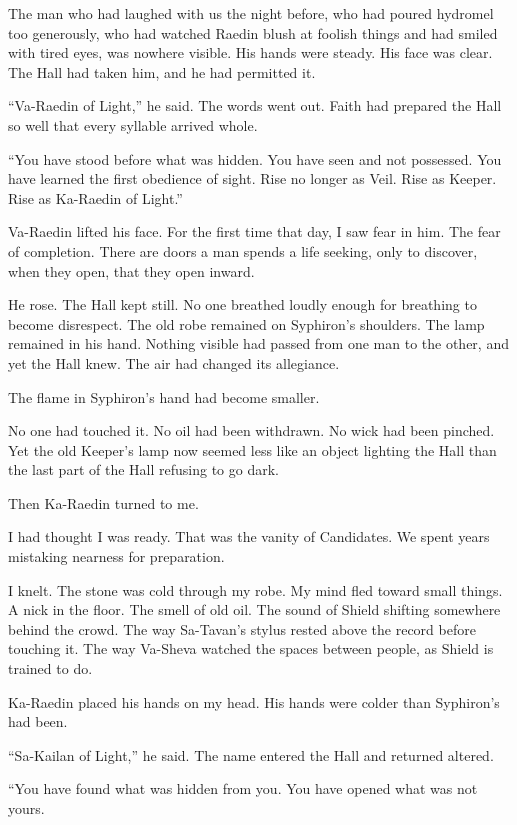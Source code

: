 The man who had laughed with us the night before, who had poured hydromel too generously, who had watched Raedin blush at foolish things and had smiled with tired eyes, was nowhere visible.
His hands were steady.
His face was clear.
The Hall had taken him, and he had permitted it.\par
``Va-Raedin of Light,'' he said.
The words went out.
Faith had prepared the Hall so well that every syllable arrived whole.\par
``You have stood before what was hidden.
You have seen and not possessed.
You have learned the first obedience of sight.
Rise no longer as Veil.
Rise as Keeper.
Rise as Ka-Raedin of Light.''\par
Va-Raedin lifted his face.
For the first time that day, I saw fear in him.
The fear of completion.
There are doors a man spends a life seeking, only to discover, when they open, that they open inward.\par
He rose.
The Hall kept still.
No one breathed loudly enough for breathing to become disrespect.
The old robe remained on Syphiron's shoulders.
The lamp remained in his hand.
Nothing visible had passed from one man to the other, and yet the Hall knew.
The air had changed its allegiance.\par
The flame in Syphiron's hand had become smaller.\par
No one had touched it.
No oil had been withdrawn.
No wick had been pinched.
Yet the old Keeper's lamp now seemed less like an object lighting the Hall than the last part of the Hall refusing to go dark.\par
Then Ka-Raedin turned to me.\par
I had thought I was ready.
That was the vanity of Candidates.
We spent years mistaking nearness for preparation.\par
I knelt.
The stone was cold through my robe.
My mind fled toward small things.
A nick in the floor.
The smell of old oil.
The sound of Shield shifting somewhere behind the crowd.
The way Sa-Tavan's stylus rested above the record before touching it.
The way Va-Sheva watched the spaces between people, as Shield is trained to do.\par
Ka-Raedin placed his hands on my head.
His hands were colder than Syphiron's had been.\par
``Sa-Kailan of Light,'' he said.
The name entered the Hall and returned altered.\par
``You have found what was hidden from you.
You have opened what was not yours.
